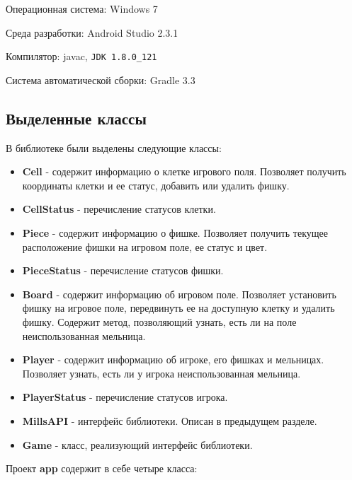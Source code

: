 \documentclass[a4paper]{article}
\begin{document}
Операционная система: Windows 7

Среда разработки: Android Studio 2.3.1

Компилятор: javac, \verb|JDK 1.8.0_121|

Система автоматической сборки: Gradle 3.3

\subsection{Выделенные классы}

В библиотеке были выделены следующие классы:
\begin{itemize}

\item \textbf{Cell}  - содержит информацию о клетке игрового поля. Позволяет получить координаты клетки и ее статус, добавить или удалить фишку.

\item \textbf{CellStatus} - перечисление статусов клетки.

\item \textbf{Piece} - содержит информацию о фишке. Позволяет получить текущее расположение фишки на игровом поле, ее статус и цвет.

\item \textbf{PieceStatus} - перечисление статусов фишки.

\item \textbf{Board} - содержит информацию об игровом поле. Позволяет установить фишку на игровое поле, передвинуть ее на доступную клетку и удалить фишку. Содержит метод, позволяющий узнать, есть ли на поле неиспользованная мельница.  

\item \textbf{Player} - содержит информацию об игроке, его фишках и мельницах. Позволяет узнать, есть ли у игрока неиспользованная мельница.

\item \textbf{PlayerStatus} - перечисление статусов игрока.

\item \textbf{MillsAPI} - интерфейс библиотеки. Описан в предыдущем разделе.

\item \textbf{Game} - класс, реализующий интерфейс библиотеки. 

\end{itemize}

Проект \textbf{app} содержит в себе четыре класса:
\end{document}
